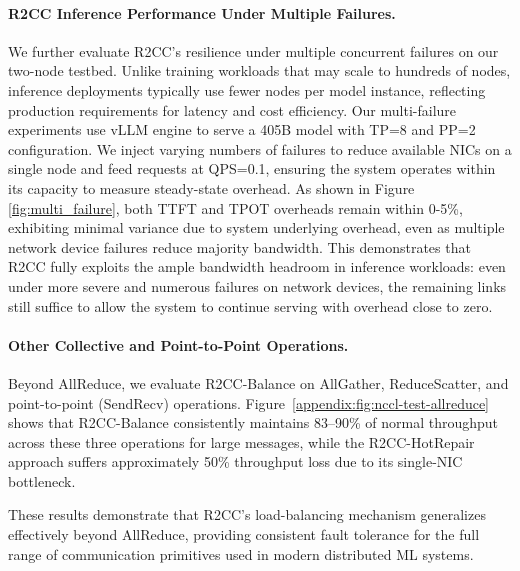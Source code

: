 \paragraph{R2CC Inference Performance Under Multiple Failures.}\label{multi-failure-inference} We further evaluate R2CC's resilience under multiple concurrent failures on our two-node testbed. Unlike training workloads that may scale to hundreds of nodes, inference deployments typically use fewer nodes per model instance, reflecting production requirements for latency and cost efficiency. Our multi-failure experiments use vLLM engine to serve a 405B model with TP=8 and PP=2 configuration. We inject varying numbers of failures to reduce available NICs on a single node and feed requests at QPS=0.1, ensuring the system operates within its capacity to measure steady-state overhead. As shown in Figure \ref{fig:multi_failure}, both TTFT and TPOT overheads remain within 0-5\%, exhibiting minimal variance due to system underlying overhead, even as multiple network device failures reduce majority bandwidth. This demonstrates that R2CC fully exploits the ample bandwidth headroom in inference workloads: even under more severe and numerous failures on network devices, the remaining links still suffice to allow the system to continue serving with overhead close to zero.

\paragraph{Other Collective and Point-to-Point Operations.}
Beyond AllReduce, we evaluate R2CC-Balance on AllGather, ReduceScatter, and point-to-point (SendRecv) operations. Figure~\ref{appendix:fig:nccl-test-allreduce} shows that R2CC-Balance consistently maintains 83--90\% of normal throughput across these three operations for large messages, while the R2CC-HotRepair approach suffers approximately 50\% throughput loss due to its single-NIC bottleneck.

These results demonstrate that R2CC's load-balancing mechanism generalizes effectively beyond AllReduce, providing consistent fault tolerance for the full range of communication primitives used in modern distributed ML systems.

